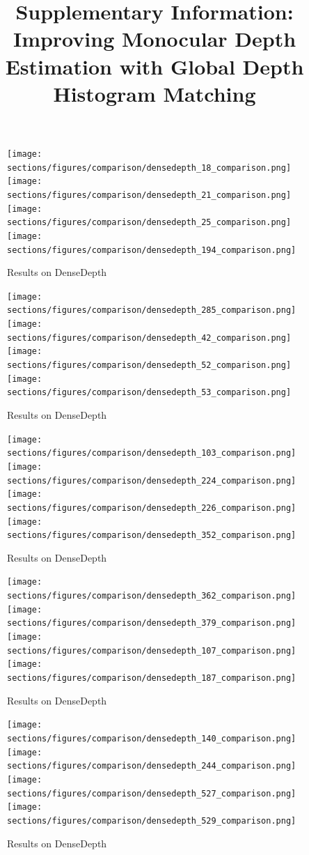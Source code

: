 \documentclass[10pt,letterpaper]{article}
\begin{document}
\title{Supplementary Information: Improving Monocular Depth Estimation with
  Global Depth Histogram Matching}

\maketitle
\begin{figure}
  \texttt{[image: sections/figures/comparison/densedepth\_18\_comparison.png]}
  \texttt{[image: sections/figures/comparison/densedepth\_21\_comparison.png]}
  \texttt{[image: sections/figures/comparison/densedepth\_25\_comparison.png]}
  \texttt{[image: sections/figures/comparison/densedepth\_194\_comparison.png]}
  \caption{Results on DenseDepth}
\end{figure}
\begin{figure}
  \texttt{[image: sections/figures/comparison/densedepth\_285\_comparison.png]}
  \texttt{[image: sections/figures/comparison/densedepth\_42\_comparison.png]}
  \texttt{[image: sections/figures/comparison/densedepth\_52\_comparison.png]}
  \texttt{[image: sections/figures/comparison/densedepth\_53\_comparison.png]}
  \caption{Results on DenseDepth}
\end{figure}
\begin{figure}
  \texttt{[image: sections/figures/comparison/densedepth\_103\_comparison.png]}
  \texttt{[image: sections/figures/comparison/densedepth\_224\_comparison.png]}
  \texttt{[image: sections/figures/comparison/densedepth\_226\_comparison.png]}
  \texttt{[image: sections/figures/comparison/densedepth\_352\_comparison.png]}
  \caption{Results on DenseDepth}
\end{figure}
\begin{figure}
  \texttt{[image: sections/figures/comparison/densedepth\_362\_comparison.png]}
  \texttt{[image: sections/figures/comparison/densedepth\_379\_comparison.png]}
  \texttt{[image: sections/figures/comparison/densedepth\_107\_comparison.png]}
  \texttt{[image: sections/figures/comparison/densedepth\_187\_comparison.png]}
  \caption{Results on DenseDepth}
\end{figure}
\begin{figure}
  \texttt{[image: sections/figures/comparison/densedepth\_140\_comparison.png]}
  \texttt{[image: sections/figures/comparison/densedepth\_244\_comparison.png]}
  \texttt{[image: sections/figures/comparison/densedepth\_527\_comparison.png]}
  \texttt{[image: sections/figures/comparison/densedepth\_529\_comparison.png]}
  \caption{Results on DenseDepth}
\end{figure}
\end{document}
